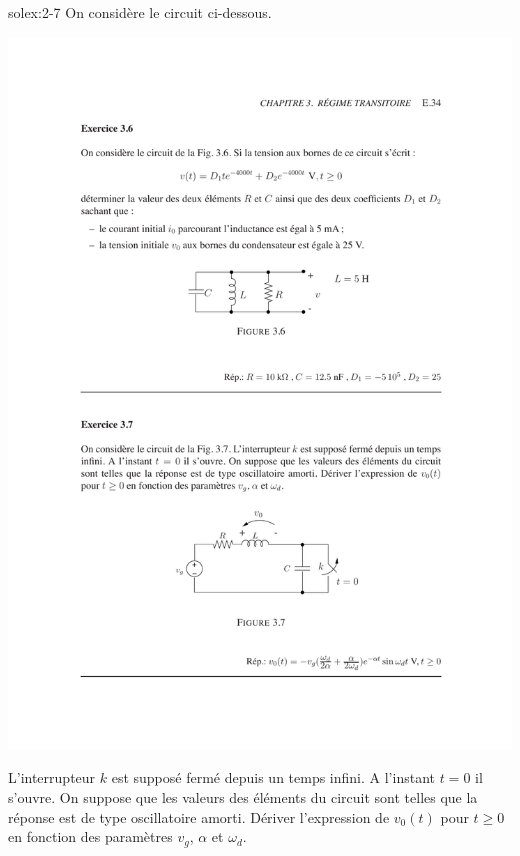 \begin{exwithsol}{}{solex:2-7}
	\label{ex:2-7}
On consid\`ere le circuit ci-dessous. 
\begin{center}
	\includegraphics[width=0.5\linewidth]{exercices/ex-3-7}
\end{center}
L'interrupteur
$k$ est suppos\'e ferm\'e depuis un temps infini. A l'instant $t=0$ il
s'ouvre. On suppose que les valeurs des \'el\'ements du circuit sont telles
que la r\'eponse est de type oscillatoire amorti.  D\'eriver l'expression
de $v_0(t)$ pour $t\geq 0$ en fonction des param\`etres $v_g$, $\alpha$ et 
$\omega_d$.

\end{exwithsol}

